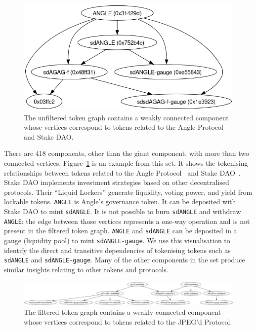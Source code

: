 \begin{figure}
  \centerline{\includegraphics[width=\columnwidth]{img/medium-components/angle-protocol.png}}
  \caption{The unfiltered token graph contains a weakly connected
    component whose vertices correspond to tokens related to the Angle
    Protocol and Stake DAO.}\label{fig:angle-protocol}
\end{figure}

There are \num{418} components, other than the giant component, with
more than two connected vertices.  Figure~\ref{fig:angle-protocol} is
an example from this set.  It shows the tokenising relationships
between tokens related to the Angle Protocol~\cite{angle-21} and Stake
DAO~\cite{stake-dao-xx}.  Stake DAO implements investment strategies
based on other decentralised protocols.  Their ``Liquid Lockers''
generate liquidity, voting power, and yield from lockable tokens.
\texttt{ANGLE} is Angle's governance token.  It can be deposited with
Stake DAO to mint \texttt{sdANGLE}.  It is not possible to burn
\texttt{sdANGLE} and withdraw \texttt{ANGLE}: the edge between those
vertices represents a one-way operation and is not present in the
filtered token graph. \texttt{ANGLE} and \texttt{sdANGLE} can be
deposited in a gauge (liquidity pool) to mint \texttt{sdANGLE-gauge}.
We use this visualisation to identify the direct and transitive
dependencies of tokenising tokens such as \texttt{sdANGLE} and
\texttt{sdANGLE-gauge}.  Many of the other components in the set
produce similar insights relating to other tokens and protocols.

\begin{figure}
  \centerline{\includegraphics[width=\textwidth]{img/medium-components/jpegd-protocol.png}}
  \caption{The filtered token graph contains a weakly connected
    component whose vertices correspond to tokens related to the
    JPEG'd Protocol.}\label{fig:jpegd-protocol}
\end{figure}

